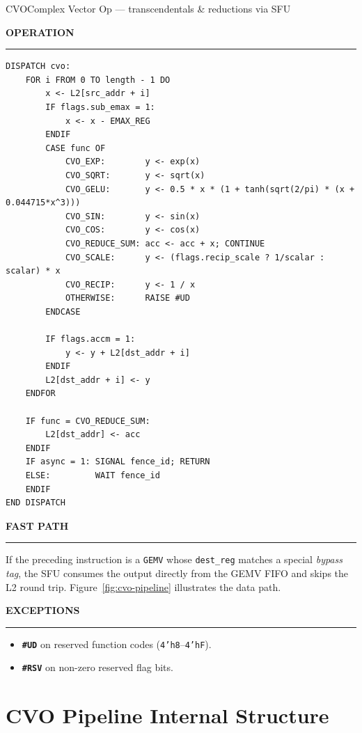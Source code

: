 \documentclass[11pt,a4paper,twoside,openany]{report}
\newcommand{\RefSection}[1]{%
  \par\medskip
  {\sffamily\bfseries\color{oceanblue}\normalsize\MakeUppercase{#1}}
  \par\vspace{-0.4em}
  {\color{oceanblue}\rule{\linewidth}{0.4pt}}\par\smallskip
}
\begin{document}
\begin{InstructionRef}{CVO}{Complex Vector Op --- transcendentals \& reductions via SFU}
\RefSection{Operation}

\begin{lstlisting}[style=pseudo]
DISPATCH cvo:
    FOR i FROM 0 TO length - 1 DO
        x <- L2[src_addr + i]
        IF flags.sub_emax = 1:
            x <- x - EMAX_REG
        ENDIF
        CASE func OF
            CVO_EXP:        y <- exp(x)
            CVO_SQRT:       y <- sqrt(x)
            CVO_GELU:       y <- 0.5 * x * (1 + tanh(sqrt(2/pi) * (x + 0.044715*x^3)))
            CVO_SIN:        y <- sin(x)
            CVO_COS:        y <- cos(x)
            CVO_REDUCE_SUM: acc <- acc + x; CONTINUE
            CVO_SCALE:      y <- (flags.recip_scale ? 1/scalar : scalar) * x
            CVO_RECIP:      y <- 1 / x
            OTHERWISE:      RAISE #UD
        ENDCASE

        IF flags.accm = 1:
            y <- y + L2[dst_addr + i]
        ENDIF
        L2[dst_addr + i] <- y
    ENDFOR

    IF func = CVO_REDUCE_SUM:
        L2[dst_addr] <- acc
    ENDIF
    IF async = 1: SIGNAL fence_id; RETURN
    ELSE:         WAIT fence_id
    ENDIF
END DISPATCH
\end{lstlisting}

\RefSection{Fast path}

If the preceding instruction is a \texttt{GEMV} whose \texttt{dest\_reg}
matches a special \textit{bypass tag}, the SFU consumes the output
directly from the GEMV FIFO and skips the L2 round trip.
Figure~\ref{fig:cvo-pipeline} illustrates the data path.

\RefSection{Exceptions}

\begin{itemize}[leftmargin=*, itemsep=0.2ex]
  \item \textbf{\texttt{\#UD}} on reserved function codes (\texttt{4'h8}--\texttt{4'hF}).
  \item \textbf{\texttt{\#RSV}} on non-zero reserved flag bits.
\end{itemize}
\end{InstructionRef}

\section{CVO Pipeline Internal Structure}
\end{document}

